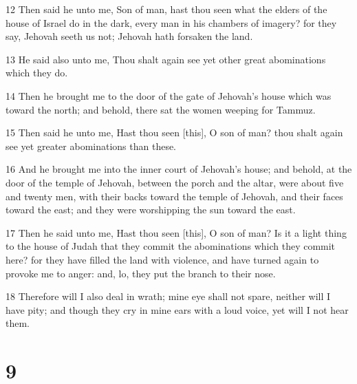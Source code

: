 \par 12 Then said he unto me, Son of man, hast thou seen what the elders of the house of Israel do in the dark, every man in his chambers of imagery? for they say, Jehovah seeth us not; Jehovah hath forsaken the land.
\par 13 He said also unto me, Thou shalt again see yet other great abominations which they do.
\par 14 Then he brought me to the door of the gate of Jehovah's house which was toward the north; and behold, there sat the women weeping for Tammuz.
\par 15 Then said he unto me, Hast thou seen [this], O son of man? thou shalt again see yet greater abominations than these.
\par 16 And he brought me into the inner court of Jehovah's house; and behold, at the door of the temple of Jehovah, between the porch and the altar, were about five and twenty men, with their backs toward the temple of Jehovah, and their faces toward the east; and they were worshipping the sun toward the east.
\par 17 Then he said unto me, Hast thou seen [this], O son of man? Is it a light thing to the house of Judah that they commit the abominations which they commit here? for they have filled the land with violence, and have turned again to provoke me to anger: and, lo, they put the branch to their nose.
\par 18 Therefore will I also deal in wrath; mine eye shall not spare, neither will I have pity; and though they cry in mine ears with a loud voice, yet will I not hear them.

\chapter{9}

